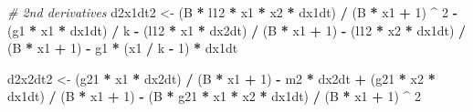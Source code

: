 \documentclass[12pt,twoside,openany]{reedthesis}
\newenvironment{Shaded}{\begin{snugshade}}{\end{snugshade}}
\newcommand{\CommentTok}[1]{\textcolor[rgb]{0.56,0.35,0.01}{\textit{#1}}}
\newcommand{\DecValTok}[1]{\textcolor[rgb]{0.00,0.00,0.81}{#1}}
\newcommand{\NormalTok}[1]{#1}
\newcommand{\OperatorTok}[1]{\textcolor[rgb]{0.81,0.36,0.00}{\textbf{#1}}}
\newcommand{\StringTok}[1]{\textcolor[rgb]{0.31,0.60,0.02}{#1}}
\begin{document}
\begin{Shaded}
\begin{Highlighting}[]
  \CommentTok{# 2nd derivatives}
\NormalTok{  d2x1dt2 <-}
\StringTok{  }\NormalTok{(B }\OperatorTok{*}\StringTok{ }\NormalTok{l12 }\OperatorTok{*}\StringTok{ }\NormalTok{x1 }\OperatorTok{*}\StringTok{ }\NormalTok{x2 }\OperatorTok{*}\StringTok{ }\NormalTok{dx1dt) }\OperatorTok{/}\StringTok{ }\NormalTok{(B }\OperatorTok{*}\StringTok{ }\NormalTok{x1 }\OperatorTok{+}\StringTok{ }\DecValTok{1}\NormalTok{) }\OperatorTok{^}\StringTok{ }\DecValTok{2} \OperatorTok{-}\StringTok{ }\NormalTok{(g1 }\OperatorTok{*}\StringTok{ }\NormalTok{x1 }\OperatorTok{*}\StringTok{ }\NormalTok{dx1dt) }\OperatorTok{/}\StringTok{ }\NormalTok{k }\OperatorTok{-}\StringTok{ }\NormalTok{(l12 }\OperatorTok{*}
\StringTok{  }\NormalTok{x1 }\OperatorTok{*}\StringTok{ }\NormalTok{dx2dt) }\OperatorTok{/}\StringTok{ }\NormalTok{(B }\OperatorTok{*}\StringTok{ }\NormalTok{x1 }\OperatorTok{+}\StringTok{ }\DecValTok{1}\NormalTok{) }\OperatorTok{-}\StringTok{ }\NormalTok{(l12 }\OperatorTok{*}\StringTok{ }\NormalTok{x2 }\OperatorTok{*}\StringTok{ }\NormalTok{dx1dt) }\OperatorTok{/}\StringTok{ }\NormalTok{(B }\OperatorTok{*}\StringTok{ }\NormalTok{x1 }\OperatorTok{+}\StringTok{ }\DecValTok{1}\NormalTok{) }\OperatorTok{-}\StringTok{ }\NormalTok{g1 }\OperatorTok{*}\StringTok{ }\NormalTok{(x1 }\OperatorTok{/}
\StringTok{  }\NormalTok{k }\OperatorTok{-}\StringTok{ }\DecValTok{1}\NormalTok{) }\OperatorTok{*}\StringTok{ }\NormalTok{dx1dt}
  
\NormalTok{  d2x2dt2 <-}
\StringTok{  }\NormalTok{(g21 }\OperatorTok{*}\StringTok{ }\NormalTok{x1 }\OperatorTok{*}\StringTok{ }\NormalTok{dx2dt) }\OperatorTok{/}\StringTok{ }\NormalTok{(B }\OperatorTok{*}\StringTok{ }\NormalTok{x1 }\OperatorTok{+}\StringTok{ }\DecValTok{1}\NormalTok{) }\OperatorTok{-}\StringTok{ }\NormalTok{m2 }\OperatorTok{*}\StringTok{ }\NormalTok{dx2dt }\OperatorTok{+}\StringTok{ }\NormalTok{(g21 }\OperatorTok{*}\StringTok{ }\NormalTok{x2 }\OperatorTok{*}\StringTok{ }\NormalTok{dx1dt) }\OperatorTok{/}\StringTok{ }\NormalTok{(B }\OperatorTok{*}
\StringTok{  }\NormalTok{x1 }\OperatorTok{+}\StringTok{ }\DecValTok{1}\NormalTok{) }\OperatorTok{-}\StringTok{ }\NormalTok{(B }\OperatorTok{*}\StringTok{ }\NormalTok{g21 }\OperatorTok{*}\StringTok{ }\NormalTok{x1 }\OperatorTok{*}\StringTok{ }\NormalTok{x2 }\OperatorTok{*}\StringTok{ }\NormalTok{dx1dt) }\OperatorTok{/}\StringTok{ }\NormalTok{(B }\OperatorTok{*}\StringTok{ }\NormalTok{x1 }\OperatorTok{+}\StringTok{ }\DecValTok{1}\NormalTok{) }\OperatorTok{^}\StringTok{ }\DecValTok{2}
  

\end{Highlighting}
\end{Shaded}
\end{document}
